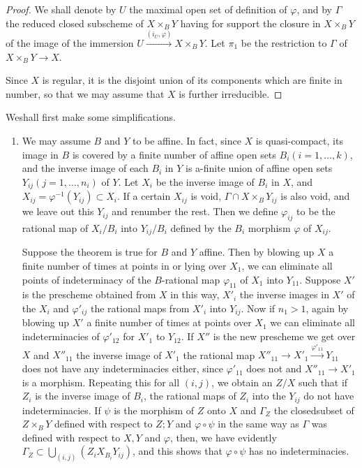 \begin{proof}
  We shall denote by $U$ the maximal open set of definition of
  $\varphi$, and by $\Gamma$ the reduced closed subscheme of $X \times_B Y$
  having for support the closure in $X \times_B Y$  of the image of the
  immersion $U \xrightarrow{(i_U,\varphi)} X \times_B Y$. Let $\pi_1$
  be the restriction to $\Gamma$ of $ X \times_B Y \to X$.  
 
Since $X$ is regular, it is the disjoint union of its components which
are finite in number, so that we may assume that $X$ is further
irreducible. 
\end{proof}

We\pageoriginale shall first make some simplifications. 
\begin{enumerate}
\renewcommand{\labelenumi}{\theenumi)} 
\item We may assume $B$ and $Y$ to be affine. In fact, since $X$ is
  quasi-compact, its image in $B$ is 
covered by a finite number of affine open sets $B_i(i = 1, \ldots
,k)$, and the inverse image of each $B_i$ in $Y$ is a-finite union of
affine open sets $Y_{ij}(j=1, \ldots ,n_i)$ of $Y$. Let $X_i$ be the
inverse image of $B_i$ in $X$, and $X_{ij} = \varphi^{-1}(Y_{ij})
\subset X_i$. If a certain $X_{ij}$ is void, $\Gamma \cap X \times_B  
Y_{ij}$ is also void, and we leave out this $Y_{ij}$ and renumber the
rest. Then we define $\varphi_{ij}$ to be the rational map of
$X_i/B_i$ into $Y_{ij}/B_i$ defined by the $B_i$ morphism $\varphi$ of
$X_{ij}$. 
 
Suppose the theorem is true for $B$ and $Y$ affine. Then by blowing up
$X$ a finite number of times at points in or lying over $X_1$, we can
eliminate all points of indeterminacy of the $B$-rational map
$\varphi_{11}$ of $X_1$ into $Y_{11}$. Suppose $X'$ is the prescheme
obtained from $X$ in this way, $X'_i$ the inverse images in $X'$ of
the $X_i$ and $\varphi'_{ij}$ the rational maps from $X'_i$ into
$Y_{ij}$. Now if $n_1 > 1$, again by blowing up $X'$ a finite number
of times at points over $X_1$ we can eliminate all indeterminacies of
$\varphi'_{12}$ for $X'_1$ to $Y_{12}$. If $X''$ is the new prescheme
we get over $X$ and $X''_{11}$ the inverse image of $X'_1$ the rational
map $X''_{11} \to X'_1 \overset{\varphi'_{11}} \longrightarrow Y_{11}$
does not have any indeterminacies either, since $\varphi'_{11}$ does
not and $X''_{11} \to X'_1$ is a morphism. Repeating this for all
$(i,j)$, we obtain an $Z/X$ such that if $Z_i$ is the inverse image of
$B_i$, the rational maps of $Z_i$ into the $Y_{ij}$ do not have
indeterminacies. If $\psi$ is the morphism of $Z$ onto $X$ and
$\Gamma_Z$ the closed\pageoriginale subset of $Z \times_B Y$ defined
with respect to $ 
Z ; Y$ and $\varphi \circ \psi $ in the same way as $\Gamma$ was
defined with respect to $X, Y$ and $\varphi$, then, we have evidently
$\Gamma_{Z} \subset \bigcup\limits_{(i,j)} (Z_{i}X_{B_{i}} Y_{ij})$,
and this shows that $\varphi \circ \psi$ has no indeterminacies.  


\end{enumerate}
